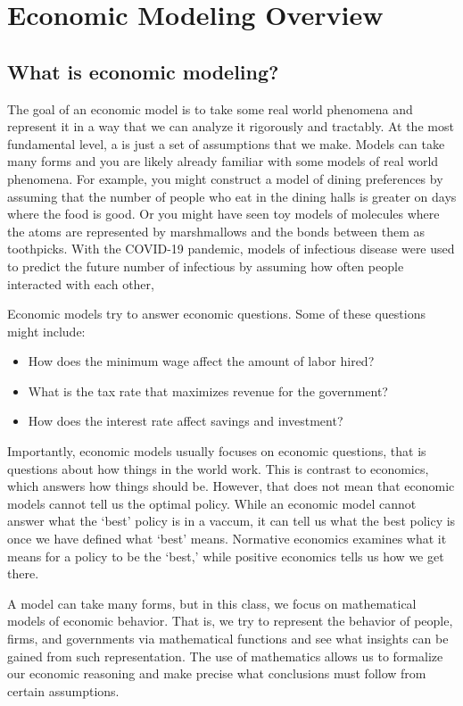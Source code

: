 \chapter{Economic Modeling Overview}

\section{What is economic modeling?}
The goal of an economic model is to take some real world phenomena and represent it in a way that we can analyze it rigorously and tractably. At the most fundamental level, a  is just a set of assumptions that we make. Models can take many forms and you are likely already familiar with some models of real world phenomena. For example, you might construct a model of dining preferences by assuming that the number of people who eat in the dining halls is greater on days where the food is good. Or you might have seen toy models of molecules where the atoms are represented by marshmallows and the bonds between them as toothpicks. With the COVID-19 pandemic, models of infectious disease were used to predict the future number of infectious by assuming how often people interacted with each other,  

Economic models try to answer economic questions. Some of these questions might include:
\begin{itemize}
    \item How does the minimum wage affect the amount of labor hired?
    \item What is the tax rate that maximizes revenue for the government?
    \item How does the interest rate affect savings and investment?
\end{itemize}
Importantly, economic models usually focuses on  economic questions, that is questions about how things in the world work. This is contrast to  economics, which answers how things should be. However, that does not mean that economic models cannot tell us the optimal policy. While an economic model cannot answer what the `best' policy is in a vaccum, it can tell us what the best policy is once we have defined what `best' means. Normative economics examines what it means for a policy to be the `best,' while positive economics tells us how we get there.

A model can take many forms, but in this class, we focus on mathematical models of economic behavior. That is, we try to represent the behavior of people, firms, and governments via mathematical functions and see what insights can be gained from such representation. The use of mathematics allows us to formalize our economic reasoning and make precise what conclusions must follow from certain assumptions. 

